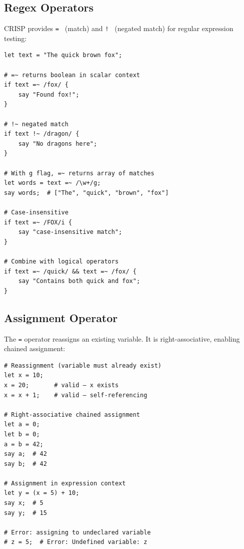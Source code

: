 \subsection{Regex Operators}

CRISP provides \texttt{=~} (match) and \texttt{!~} (negated match) for regular expression testing:

\begin{tcolorbox}[colback=codebg, colframe=darkpurple, colbacktitle=darkpurple, title=\textbf{\textcolor{codegold}{Regex Operators}}, fonttitle=\bfseries, sharp corners]
\begin{lstlisting}
let text = "The quick brown fox";

# =~ returns boolean in scalar context
if text =~ /fox/ {
    say "Found fox!";
}

# !~ negated match
if text !~ /dragon/ {
    say "No dragons here";
}

# With g flag, =~ returns array of matches
let words = text =~ /\w+/g;
say words;  # ["The", "quick", "brown", "fox"]

# Case-insensitive
if text =~ /FOX/i {
    say "case-insensitive match";
}

# Combine with logical operators
if text =~ /quick/ && text =~ /fox/ {
    say "Contains both quick and fox";
}
\end{lstlisting}
\end{tcolorbox}

\subsection{Assignment Operator}

The \texttt{=} operator reassigns an existing variable. It is right-associative, enabling chained assignment:

\begin{tcolorbox}[colback=codebg, colframe=darkpurple, colbacktitle=darkpurple, title=\textbf{\textcolor{codegold}{Assignment Operator}}, fonttitle=\bfseries, sharp corners]
\begin{lstlisting}
# Reassignment (variable must already exist)
let x = 10;
x = 20;       # valid — x exists
x = x + 1;    # valid — self-referencing

# Right-associative chained assignment
let a = 0;
let b = 0;
a = b = 42;
say a;  # 42
say b;  # 42

# Assignment in expression context
let y = (x = 5) + 10;
say x;  # 5
say y;  # 15

# Error: assigning to undeclared variable
# z = 5;  # Error: Undefined variable: z
\end{lstlisting}
\end{tcolorbox}

